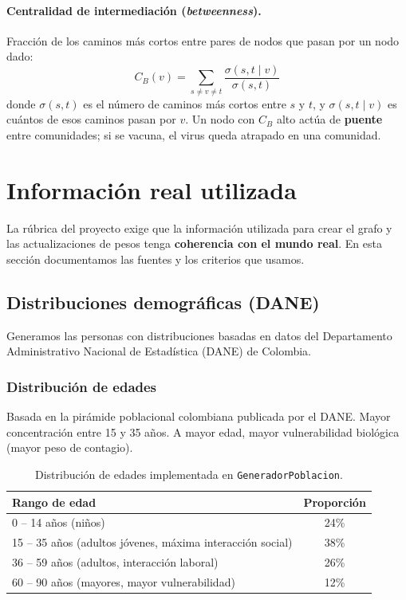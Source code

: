 \documentclass[spanish,notitlepage,letterpaper, 12pt]{article}
\begin{document}
\paragraph{Centralidad de intermediaci\'on (\textit{betweenness}).} Fracci\'on de los caminos m\'as cortos entre pares de nodos que pasan por un nodo dado:
\begin{equation}
C_B(v) = \sum_{s \neq v \neq t} \frac{\sigma(s, t \mid v)}{\sigma(s, t)}
\label{eq:betweenness}
\end{equation}
donde $\sigma(s,t)$ es el n\'umero de caminos m\'as cortos entre $s$ y $t$, y $\sigma(s,t \mid v)$ es cu\'antos de esos caminos pasan por $v$. Un nodo con $C_B$ alto act\'ua de \textbf{puente} entre comunidades; si se vacuna, el virus queda atrapado en una comunidad.

\newpage
\section{Informaci\'on real utilizada}
\label{sec:informacion}

La r\'ubrica del proyecto exige que la informaci\'on utilizada para crear el grafo y las actualizaciones de pesos tenga \textbf{coherencia con el mundo real}. En esta secci\'on documentamos las fuentes y los criterios que usamos.

\subsection{Distribuciones demogr\'aficas (DANE)}

Generamos las personas con distribuciones basadas en datos del Departamento Administrativo Nacional de Estad\'istica (DANE) de Colombia.

\subsubsection{Distribuci\'on de edades}

Basada en la pir\'amide poblacional colombiana publicada por el DANE. Mayor concentraci\'on entre 15 y 35 a\~nos. A mayor edad, mayor vulnerabilidad biol\'ogica (mayor peso de contagio).

\begin{table}[H]
\centering
\caption{Distribuci\'on de edades implementada en \texttt{GeneradorPoblacion}.}
\label{tab:dist_edades}
\begin{tabular}{lc}
\toprule
\textbf{Rango de edad} & \textbf{Proporci\'on} \\
\midrule
0 -- 14 a\~nos (ni\~nos) & 24\% \\
15 -- 35 a\~nos (adultos j\'ovenes, m\'axima interacci\'on social) & 38\% \\
36 -- 59 a\~nos (adultos, interacci\'on laboral) & 26\% \\
60 -- 90 a\~nos (mayores, mayor vulnerabilidad) & 12\% \\
\bottomrule
\end{tabular}
\end{table}
\end{document}
